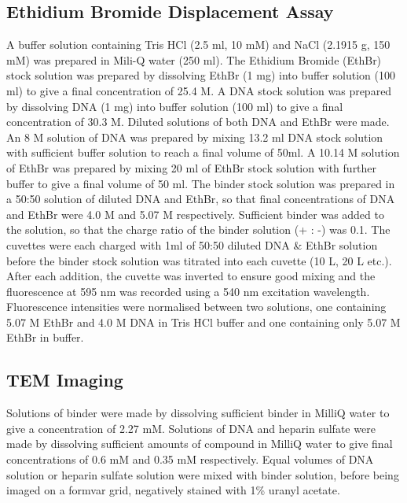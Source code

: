 \subsection*{Ethidium Bromide Displacement Assay} 
A buffer solution containing Tris HCl (2.5 ml, 10 mM) and NaCl (2.1915 g, 150 mM) was prepared in Mili-Q water  (250 ml). 
\newline
The Ethidium Bromide (EthBr) stock solution was prepared by dissolving EthBr (1 mg) into buffer solution (100 ml) to give a final concentration of 25.4 \textmu M. 
\newline
A DNA stock solution was prepared by dissolving DNA (1 mg) into buffer solution (100 ml) to give a final concentration of 30.3 \textmu M. 
\newline
Diluted solutions of both DNA and EthBr were made. An 8 \textmu M solution of DNA was prepared by mixing 13.2 ml DNA stock solution with sufficient buffer solution to reach a final volume of 50ml. 
\newline
A 10.14 \textmu M solution of EthBr was prepared by mixing 20 ml of EthBr stock solution with further buffer to give a final volume of 50 ml. 
\newline
The binder stock solution was prepared in a 50:50 solution of diluted DNA and EthBr, so that final concentrations of DNA and EthBr were 4.0 \textmu M and 5.07 \textmu M respectively. Sufficient binder was added to the solution, so that the charge ratio of the binder solution (+ : -) was 0.1. 
\newline
The cuvettes were each charged with 1ml of 50:50 diluted DNA \& EthBr solution before the binder stock solution was titrated into each cuvette (10 \textmu L, 20 \textmu L etc.). 
After each addition, the cuvette was inverted to ensure good mixing and the fluorescence at 595 nm was recorded using a 540 nm excitation wavelength.  
\newline
Fluorescence intensities were normalised between two solutions, one containing 5.07 \textmu M EthBr and 4.0 \textmu M DNA in Tris HCl buffer and one containing only 5.07 \textmu M EthBr in buffer. 

\subsection*{TEM Imaging}
Solutions of  binder were made by dissolving sufficient binder in MilliQ water to give a concentration of 2.27 mM. 
Solutions of DNA and heparin sulfate were made by dissolving sufficient amounts of compound in MilliQ water to give final concentrations of 0.6  mM and 0.35 mM respectively.
Equal volumes of DNA solution or heparin sulfate solution were mixed with binder solution, before being imaged on a formvar grid, negatively stained with 1\% uranyl acetate. 

